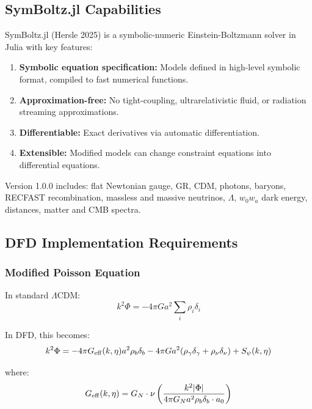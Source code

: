 \documentclass[11pt,a4paper]{article}
\begin{document}
\subsection{SymBoltz.jl Capabilities}

SymBoltz.jl (Hersle 2025) is a symbolic-numeric Einstein-Boltzmann solver in Julia with key features:

\begin{enumerate}
\item \textbf{Symbolic equation specification:} Models defined in high-level symbolic format, compiled to fast numerical functions.
\item \textbf{Approximation-free:} No tight-coupling, ultrarelativistic fluid, or radiation streaming approximations.
\item \textbf{Differentiable:} Exact derivatives via automatic differentiation.
\item \textbf{Extensible:} Modified models can change constraint equations into differential equations.
\end{enumerate}

Version 1.0.0 includes: flat Newtonian gauge, GR, CDM, photons, baryons, RECFAST recombination, massless and massive neutrinos, $\Lambda$, $w_0 w_a$ dark energy, distances, matter and CMB spectra.

\subsection{DFD Implementation Requirements}

\subsubsection{Modified Poisson Equation}

In standard $\Lambda$CDM:
\begin{equation}
k^2\Phi = -4\pi G a^2 \sum_i \rho_i\delta_i
\end{equation}

In DFD, this becomes:
\begin{equation}
k^2\Phi = -4\pi G_{\rm eff}(k,\eta) a^2 \rho_b\delta_b - 4\pi G a^2(\rho_\gamma\delta_\gamma + \rho_\nu\delta_\nu) + S_\psi(k,\eta)
\end{equation}

where:
\begin{equation}
G_{\rm eff}(k,\eta) = G_N\cdot\nu\left(\frac{k^2|\Phi|}{4\pi G_N a^2\rho_b\delta_b \cdot a_0}\right)
\end{equation}
\end{document}
